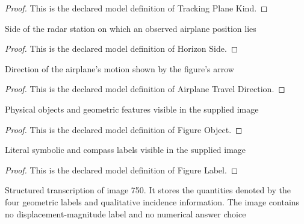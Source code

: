 \begin{proof}
  This is the declared model definition of Tracking Plane Kind.
\end{proof}
\begin{definition}
  \label{def:physics:phyx-mini-0750:phyxminiproblems-problemphyxmini0750-horizonside}
  Side of the radar station on which an observed airplane position lies
\end{definition}
\begin{proof}
  This is the declared model definition of Horizon Side.
\end{proof}
\begin{definition}
  \label{def:physics:phyx-mini-0750:phyxminiproblems-problemphyxmini0750-airplanetraveldirection}
  Direction of the airplane's motion shown by the figure's arrow
\end{definition}
\begin{proof}
  This is the declared model definition of Airplane Travel Direction.
\end{proof}
\begin{definition}
  \label{def:physics:phyx-mini-0750:phyxminiproblems-problemphyxmini0750-figureobject}
  Physical objects and geometric features visible in the supplied image
\end{definition}
\begin{proof}
  This is the declared model definition of Figure Object.
\end{proof}
\begin{definition}
  \label{def:physics:phyx-mini-0750:phyxminiproblems-problemphyxmini0750-figurelabel}
  Literal symbolic and compass labels visible in the supplied image
\end{definition}
\begin{proof}
  This is the declared model definition of Figure Label.
\end{proof}
\begin{definition}
  \label{def:physics:phyx-mini-0750:phyxminiproblems-problemphyxmini0750-suppliedradarfigure}
  Structured transcription of image 750. It stores the quantities denoted by the four geometric labels and qualitative incidence information. The image contains no displacement-magnitude label and no numerical answer choice
\end{definition}
